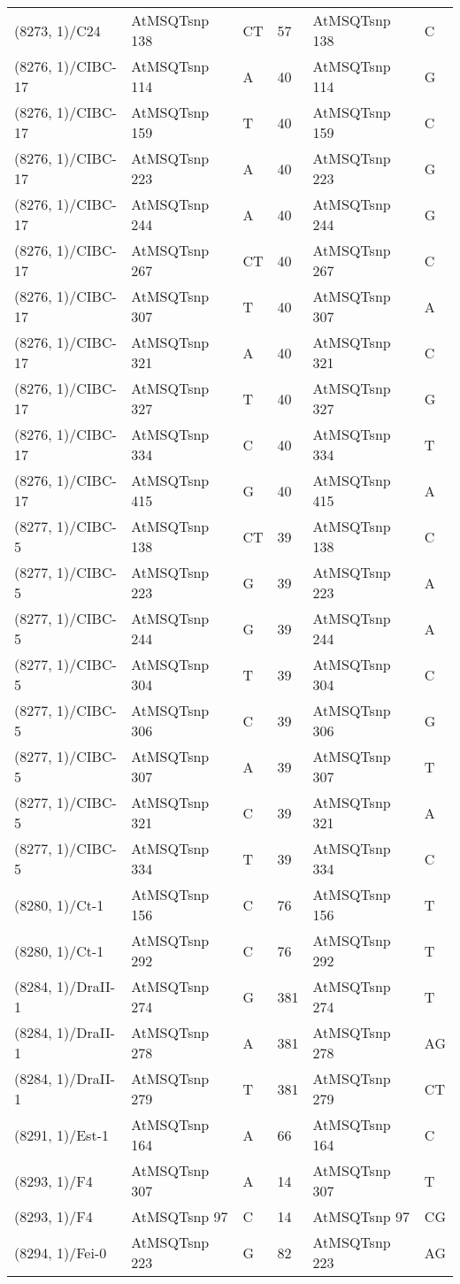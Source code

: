 \begin{center}
\begin{longtable}{|l|l|l|l|l|l|}
(8273, 1)/C24&AtMSQTsnp 138&CT&57&AtMSQTsnp 138&C\\
(8276, 1)/CIBC-17&AtMSQTsnp 114&A&40&AtMSQTsnp 114&G\\
(8276, 1)/CIBC-17&AtMSQTsnp 159&T&40&AtMSQTsnp 159&C\\
(8276, 1)/CIBC-17&AtMSQTsnp 223&A&40&AtMSQTsnp 223&G\\
(8276, 1)/CIBC-17&AtMSQTsnp 244&A&40&AtMSQTsnp 244&G\\
(8276, 1)/CIBC-17&AtMSQTsnp 267&CT&40&AtMSQTsnp 267&C\\
(8276, 1)/CIBC-17&AtMSQTsnp 307&T&40&AtMSQTsnp 307&A\\
(8276, 1)/CIBC-17&AtMSQTsnp 321&A&40&AtMSQTsnp 321&C\\
(8276, 1)/CIBC-17&AtMSQTsnp 327&T&40&AtMSQTsnp 327&G\\
(8276, 1)/CIBC-17&AtMSQTsnp 334&C&40&AtMSQTsnp 334&T\\
(8276, 1)/CIBC-17&AtMSQTsnp 415&G&40&AtMSQTsnp 415&A\\
(8277, 1)/CIBC-5&AtMSQTsnp 138&CT&39&AtMSQTsnp 138&C\\
(8277, 1)/CIBC-5&AtMSQTsnp 223&G&39&AtMSQTsnp 223&A\\
(8277, 1)/CIBC-5&AtMSQTsnp 244&G&39&AtMSQTsnp 244&A\\
(8277, 1)/CIBC-5&AtMSQTsnp 304&T&39&AtMSQTsnp 304&C\\
(8277, 1)/CIBC-5&AtMSQTsnp 306&C&39&AtMSQTsnp 306&G\\
(8277, 1)/CIBC-5&AtMSQTsnp 307&A&39&AtMSQTsnp 307&T\\
(8277, 1)/CIBC-5&AtMSQTsnp 321&C&39&AtMSQTsnp 321&A\\
(8277, 1)/CIBC-5&AtMSQTsnp 334&T&39&AtMSQTsnp 334&C\\
(8280, 1)/Ct-1&AtMSQTsnp 156&C&76&AtMSQTsnp 156&T\\
(8280, 1)/Ct-1&AtMSQTsnp 292&C&76&AtMSQTsnp 292&T\\
(8284, 1)/DraII-1&AtMSQTsnp 274&G&381&AtMSQTsnp 274&T\\
(8284, 1)/DraII-1&AtMSQTsnp 278&A&381&AtMSQTsnp 278&AG\\
(8284, 1)/DraII-1&AtMSQTsnp 279&T&381&AtMSQTsnp 279&CT\\
(8291, 1)/Est-1&AtMSQTsnp 164&A&66&AtMSQTsnp 164&C\\
(8293, 1)/F4&AtMSQTsnp 307&A&14&AtMSQTsnp 307&T\\
(8293, 1)/F4&AtMSQTsnp 97&C&14&AtMSQTsnp 97&CG\\
(8294, 1)/Fei-0&AtMSQTsnp 223&G&82&AtMSQTsnp 223&AG\\

\end{longtable}
\end{center}
